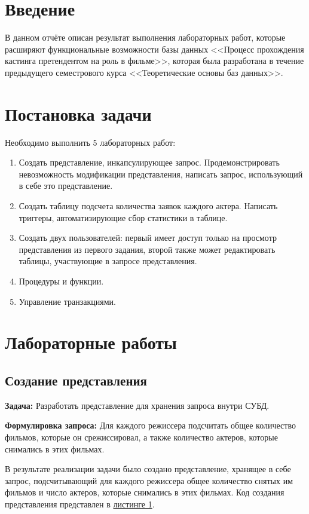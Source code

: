 \documentclass[11pt,a4paper,final]{article} %
\begin{document}
\newpage

\tableofcontents

\newpage
\section* {Введение}
В данном отчёте описан результат выполнения лабораторных работ, которые расширяют функциональные возможности базы данных <<Процесс прохождения кастинга претендентом на роль в фильме>>, которая была разработана в течение предыдущего семестрового курса <<Теоретические основы баз данных>>. 

\newpage
\section{Постановка задачи}
Необходимо выполнить 5 лабораторных работ:
\begin{enumerate}
	\item Создать представление, инкапсулирующее запрос. Продемонстрировать невозможность модификации представления, написать запрос, использующий в себе это представление.
	\item Создать таблицу подсчета количества заявок каждого актера. Написать триггеры, автоматизирующие сбор статистики в таблице.
	\item Создать двух пользователей: первый имеет доступ только на просмотр представления из первого задания, второй также может редактировать таблицы, участвующие в запросе представления.
	\item Процедуры и функции.
	\item Управление транзакциями.
\end{enumerate}

\newpage
\section{Лабораторные работы}
\subsection{Создание представления}

\textbf{Задача:} Разработать представление для хранения запроса внутри СУБД.

\textbf{Формулировка запроса:} Для каждого режиссера подсчитать общее количество фильмов, которые он срежиссировал, а также количество актеров, которые снимались в этих фильмах.

В результате реализации задачи было создано представление, хранящее в себе запрос, подсчитывающий для каждого режиссера общее количество снятых им фильмов и число актеров, которые снимались в этих фильмах. Код создания представления представлен в \hyperref[lst:l1]{листинге 1}.
\end{document}

